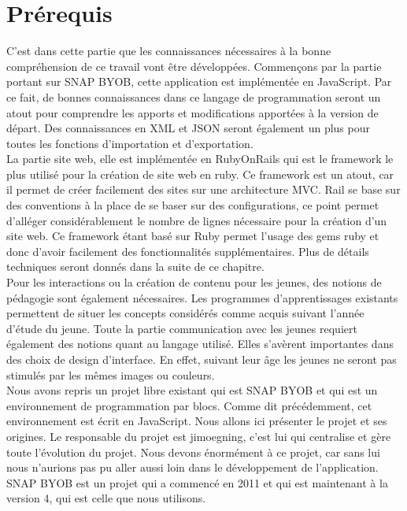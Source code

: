 \chapter{Prérequis}
C'est dans cette partie que les connaissances nécessaires à la bonne compréhension de ce travail vont être développées. Commençons par la partie portant sur SNAP BYOB, cette application est implémentée en JavaScript. Par ce fait, de bonnes connaissances dans ce langage de programmation seront un atout pour comprendre les apports et modifications apportées à la version de départ. Des connaissances en XML et JSON seront également un plus pour toutes les fonctions d'importation et d'exportation.\\

La partie site web, elle est implémentée en RubyOnRails qui est le framework le plus utilisé pour la création de site web en ruby. Ce framework est un atout, car il permet de créer facilement des sites sur une architecture MVC. Rail se base sur des conventions à la place de se baser sur des configurations, ce point permet d'alléger considérablement le nombre de lignes nécessaire pour la création d'un site web. Ce framework étant basé sur Ruby permet l'usage des gems ruby et donc d'avoir facilement des fonctionnalités supplémentaires. Plus de détails techniques seront donnés dans la suite de ce chapitre.\\

Pour les interactions ou la création de contenu pour les jeunes, des notions de pédagogie sont également nécessaires. Les programmes d'apprentissages existants permettent de situer les concepts considérés comme acquis suivant l'année d'étude du jeune. Toute la partie communication avec les jeunes requiert également des notions quant au langage utilisé. Elles s'avèrent importantes dans des choix de design d'interface. En effet, suivant leur âge les jeunes ne seront pas stimulés par les mêmes images ou couleurs.\\

Nous avons repris un projet libre existant qui est SNAP BYOB et qui est un environnement de programmation par blocs. Comme dit précédemment, cet environnement est écrit en JavaScript. Nous allons ici présenter le projet et ses origines. Le responsable du projet est jimoegning, c'est lui qui centralise et gère toute l'évolution du projet. Nous devons énormément à ce projet, car sans lui nous n'aurions pas pu aller aussi loin dans le développement de l'application. SNAP BYOB est un projet qui a commencé en 2011 et qui est maintenant à la version 4, qui est celle que nous utilisons.

